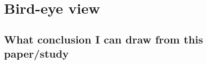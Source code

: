 \documentclass[a4paper,11pt,UKenglish,twoside,openright]{report}\usepackage[]{graphicx}\usepackage[]{color}
\begin{document}
\section{Bird-eye view}

\subsection{What conclusion I can draw from this paper/study}

\newpage
\printbibliography[title=References]





\begin{appendices}
%    
%    
%     
        \begin{singlespace}
    
        \end{singlespace}
%    
%    
%    
%    
\end{appendices}

\cleardoublepage
{}
{}
\printindex[a]

\cleardoublepage
{}
{}
\printindex
\end{document}
